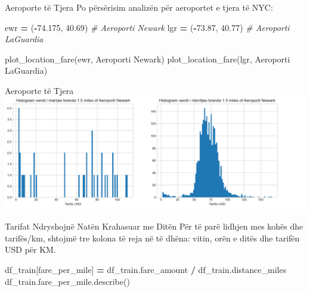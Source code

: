 \documentclass[
  ignorenonframetext,
]{beamer}
\newenvironment{Shaded}{\begin{snugshade}}{\end{snugshade}}
\newcommand{\CommentTok}[1]{\textcolor[rgb]{0.56,0.35,0.01}{\textit{#1}}}
\newcommand{\FloatTok}[1]{\textcolor[rgb]{0.00,0.00,0.81}{#1}}
\newcommand{\NormalTok}[1]{#1}
\newcommand{\OperatorTok}[1]{\textcolor[rgb]{0.81,0.36,0.00}{\textbf{#1}}}
\newcommand{\StringTok}[1]{\textcolor[rgb]{0.31,0.60,0.02}{#1}}
\begin{document}
\begin{frame}[fragile]{Aeroporte të Tjera}
\protect\hypertarget{aeroporte-tuxeb-tjera}{}
Po përsërisim analizën për aeroportet e tjera të NYC:


\begin{Shaded}
\begin{Highlighting}[]
\NormalTok{ewr }\OperatorTok{=}\NormalTok{ (}\OperatorTok{{-}}\FloatTok{74.175}\NormalTok{, }\FloatTok{40.69}\NormalTok{) }\CommentTok{\# Aeroporti Newark}
\NormalTok{lgr }\OperatorTok{=}\NormalTok{ (}\OperatorTok{{-}}\FloatTok{73.87}\NormalTok{, }\FloatTok{40.77}\NormalTok{) }\CommentTok{\# Aeroporti LaGuardia}

\NormalTok{plot\_location\_fare(ewr, }\StringTok{\textquotesingle{}Aeroporti Newark\textquotesingle{}}\NormalTok{)}
\NormalTok{plot\_location\_fare(lgr, }\StringTok{\textquotesingle{}Aeroporti LaGuardia\textquotesingle{}}\NormalTok{)}
\end{Highlighting}
\end{Shaded}
\end{frame}

\begin{frame}{Aeroporte të Tjera}
\protect\hypertarget{aeroporte-tuxeb-tjera-1}{}
\includegraphics{./Figs/train27.png}
\end{frame}

\begin{frame}[fragile]{Tarifat Ndryshojnë Natën Krahasuar me Ditën}
\protect\hypertarget{tarifat-ndryshojnuxeb-natuxebn-krahasuar-me-dituxebn}{}
Për të parë lidhjen mes kohës dhe tarifës/km, shtojmë tre kolona të reja
në të dhëna: vitin, orën e ditës dhe tarifën USD për KM.


\begin{Shaded}
\begin{Highlighting}[]
\NormalTok{df\_train[}\StringTok{\textquotesingle{}fare\_per\_mile\textquotesingle{}}\NormalTok{] }\OperatorTok{=}\NormalTok{ df\_train.fare\_amount }\OperatorTok{/}\NormalTok{ df\_train.distance\_miles}
\NormalTok{df\_train.fare\_per\_mile.describe()}
\end{Highlighting}
\end{Shaded}
\end{frame}
\end{document}
